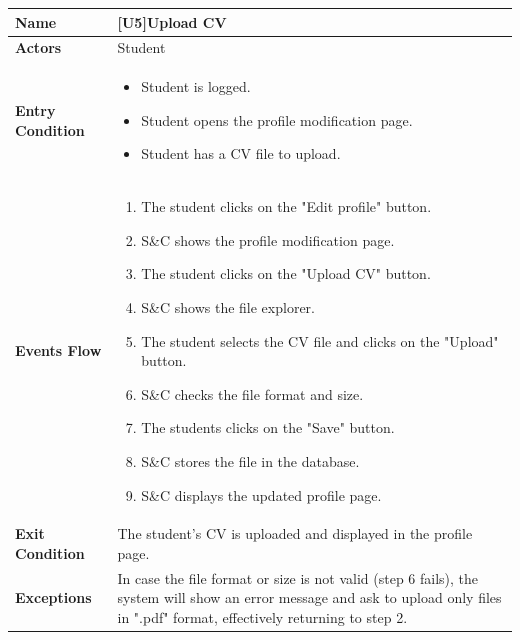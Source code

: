 \begin{center}
    \begin{tabular}{|p{9em}|p{27em}|}
        \hline
        \rowcolor{bluepoli!40} %
        \textbf{Name} & \textbf{[U5]Upload CV} \\
        \hline
        \textbf{Actors} & Student \\
        \hline
        \textbf{Entry Condition} & 
        \begin{itemize}
            \item Student is logged.
            \item Student opens the profile modification page.
            \item Student has a CV file to upload.
        \end{itemize} \\
        \hline
        \textbf{Events Flow} & 
        \begin{enumerate}
            \item The student clicks on the "Edit profile" button.
            \item S\&C shows the profile modification page.
            \item The student clicks on the "Upload CV" button.
            \item S\&C shows the file explorer.
            \item The student selects the CV file and clicks on the "Upload" button.
            \item S\&C checks the file format and size.
            \item The students clicks on the "Save" button.
            \item S\&C stores the file in the database.
            \item S\&C displays the updated profile page.
        \end{enumerate} \\
        \hline
        \textbf{Exit Condition} & The student's CV is uploaded and displayed in the profile page. \\
        \hline
        \textbf{Exceptions} & In case the file format or size is not valid (step 6 fails), the system will show an error message and ask 
        to upload only files in ".pdf" format, effectively returning to step 2. \\
        \hline
    \end{tabular}
\end{center}

